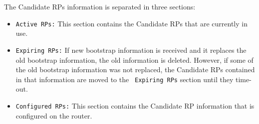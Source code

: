 \vspace{0.1in}
\noindent{}
\vspace{0.1in}

The Candidate RPs information is separated in three sections:
\begin{itemize}

  \item {\tt Active RPs:} This section contains the Candidate RPs that are
  currently in use.

  \item {\tt Expiring RPs:} If new bootstrap information is received and it
  replaces the old bootstrap information, the old information is deleted.
  However, if some of the old bootstrap information was not replaced,
  the Candidate RPs contained in that information are moved to the {\tt
  Expiring RPs} section until they time-out.

  \item {\tt Configured RPs:} This section contains the Candidate RP
  information that is configured on the router.
\end{itemize}

